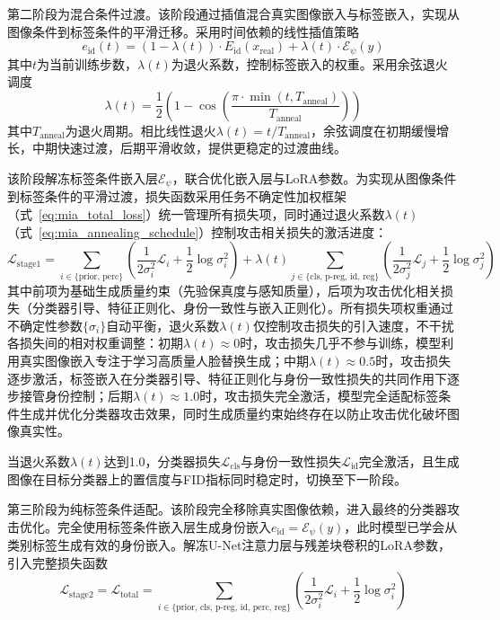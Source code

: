 第二阶段为混合条件过渡。该阶段通过插值混合真实图像嵌入与标签嵌入，实现从图像条件到标签条件的平滑迁移。采用时间依赖的线性插值策略
\begin{equation}\label{eq:mia_hybrid_embedding}
    e_{\text{id}}(t) = (1-\lambda(t)) \cdot E_{\text{id}}(x_{\text{real}}) + \lambda(t) \cdot \mathcal{E}_\psi(y)
\end{equation}
其中$t$为当前训练步数，$\lambda(t)$为退火系数，控制标签嵌入的权重。采用余弦退火调度
\begin{equation}\label{eq:mia_annealing_schedule}
    \lambda(t) = \frac{1}{2}\left(1 - \cos\left(\frac{\pi \cdot \min(t, T_{\text{anneal}})}{T_{\text{anneal}}}\right)\right)
\end{equation}
其中$T_{\text{anneal}}$为退火周期。相比线性退火$\lambda(t)=t/T_{\text{anneal}}$，余弦调度在初期缓慢增长，中期快速过渡，后期平滑收敛，提供更稳定的过渡曲线。

该阶段解冻标签条件嵌入层$\mathcal{E}_\psi$，联合优化嵌入层与LoRA参数。为实现从图像条件到标签条件的平滑过渡，损失函数采用任务不确定性加权框架（式~\ref{eq:mia_total_loss}）统一管理所有损失项，同时通过退火系数$\lambda(t)$（式~\ref{eq:mia_annealing_schedule}）控制攻击相关损失的激活进度：
\begin{equation}\label{eq:mia_stage1_loss}
    \mathcal{L}_{\text{stage1}} = \sum_{i \in \{\text{prior, perc}\}} \left( \frac{1}{2\sigma_i^2} \mathcal{L}_i + \frac{1}{2}\log\sigma_i^2 \right) + \lambda(t) \sum_{j \in \{\text{cls, p-reg, id, reg}\}} \left( \frac{1}{2\sigma_j^2} \mathcal{L}_j + \frac{1}{2}\log\sigma_j^2 \right)
\end{equation}
其中前项为基础生成质量约束（先验保真度与感知质量），后项为攻击优化相关损失（分类器引导、特征正则化、身份一致性与嵌入正则化）。所有损失项权重通过不确定性参数$\{\sigma_i\}$自动平衡，退火系数$\lambda(t)$仅控制攻击损失的引入速度，不干扰各损失间的相对权重调整：初期$\lambda(t)\approx 0$时，攻击损失几乎不参与训练，模型利用真实图像嵌入专注于学习高质量人脸替换生成；中期$\lambda(t)\approx 0.5$时，攻击损失逐步激活，标签嵌入在分类器引导、特征正则化与身份一致性损失的共同作用下逐步接管身份控制；后期$\lambda(t)\approx 1.0$时，攻击损失完全激活，模型完全适配标签条件生成并优化分类器攻击效果，同时生成质量约束始终存在以防止攻击优化破坏图像真实性。

当退火系数$\lambda(t)$达到1.0，分类器损失$\mathcal{L}_{\text{cls}}$与身份一致性损失$\mathcal{L}_{\text{id}}$完全激活，且生成图像在目标分类器上的置信度与FID指标同时稳定时，切换至下一阶段。

第三阶段为纯标签条件适配。该阶段完全移除真实图像依赖，进入最终的分类器攻击优化。完全使用标签条件嵌入层生成身份嵌入$e_{\text{id}} = \mathcal{E}_\psi(y)$，此时模型已学会从类别标签生成有效的身份嵌入。解冻U-Net注意力层与残差块卷积的LoRA参数，引入完整损失函数
\begin{equation}\label{eq:mia_stage2_loss}
    \mathcal{L}_{\text{stage2}} = \mathcal{L}_{\text{total}} = \sum_{i \in \{\text{prior, cls, p-reg, id, perc, reg}\}} \left( \frac{1}{2\sigma_i^2} \mathcal{L}_i + \frac{1}{2}\log\sigma_i^2 \right)
\end{equation}

